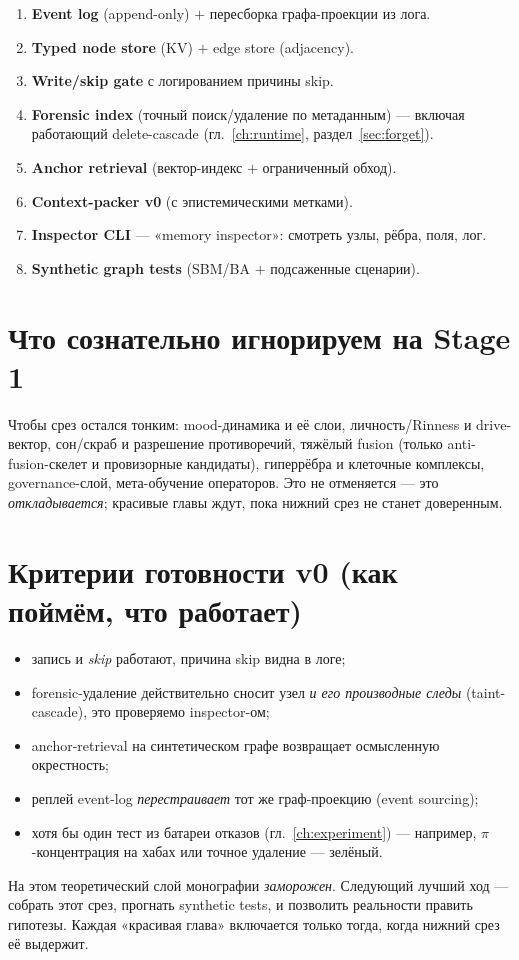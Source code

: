 \begin{enumerate}\itemsep1pt
\item \textbf{Event log} (append-only) $+$ пересборка графа-проекции из лога.
\item \textbf{Typed node store} (KV) $+$ edge store (adjacency).
\item \textbf{Write/skip gate} с логированием причины skip.
\item \textbf{Forensic index} (точный поиск/удаление по метаданным) — включая
работающий delete-cascade (гл.~\ref{ch:runtime}, раздел~\ref{sec:forget}).
\item \textbf{Anchor retrieval} (вектор-индекс $+$ ограниченный обход).
\item \textbf{Context-packer v0} (с эпистемическими метками).
\item \textbf{Inspector CLI} — «memory inspector»: смотреть узлы, рёбра, поля, лог.
\item \textbf{Synthetic graph tests} (SBM/BA $+$ подсаженные сценарии).
\end{enumerate}

\section{Что сознательно игнорируем на Stage 1}

Чтобы срез остался тонким: mood-динамика и её слои, личность/Rinness и drive-вектор,
сон/скраб и разрешение противоречий, тяжёлый fusion (только anti-fusion-скелет и
провизорные кандидаты), гиперрёбра и клеточные комплексы, governance-слой,
мета-обучение операторов. Это не отменяется — это \emph{откладывается}; красивые
главы ждут, пока нижний срез не станет доверенным.

\section{Критерии готовности v0 (как поймём, что работает)}

\begin{itemize}\itemsep1pt
\item запись и \emph{skip} работают, причина skip видна в логе;
\item forensic-удаление действительно сносит узел \emph{и его производные следы}
(taint-cascade), это проверяемо inspector-ом;
\item anchor-retrieval на синтетическом графе возвращает осмысленную окрестность;
\item реплей event-log \emph{перестраивает} тот же граф-проекцию (event sourcing);
\item хотя бы один тест из батареи отказов (гл.~\ref{ch:experiment}) — например,
$\pi$-концентрация на хабах или точное удаление — зелёный.
\end{itemize}

\begin{principle}
На этом теоретический слой монографии \emph{заморожен}. Следующий лучший ход —
собрать этот срез, прогнать synthetic tests, и позволить реальности править
гипотезы. Каждая «красивая глава» включается только тогда, когда нижний срез её
выдержит.
\end{principle}
